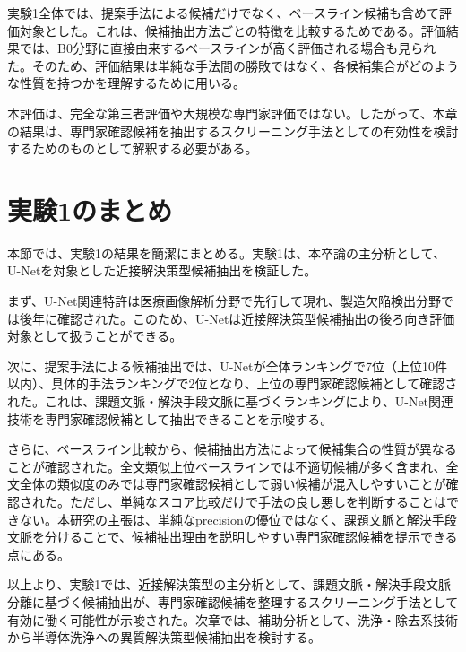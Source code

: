 実験1全体では、提案手法による候補だけでなく、ベースライン候補も含めて評価対象とした。これは、候補抽出方法ごとの特徴を比較するためである。評価結果では、B0分野に直接由来するベースラインが高く評価される場合も見られた。そのため、評価結果は単純な手法間の勝敗ではなく、各候補集合がどのような性質を持つかを理解するために用いる。

本評価は、完全な第三者評価や大規模な専門家評価ではない。したがって、本章の結果は、専門家確認候補を抽出するスクリーニング手法としての有効性を検討するためのものとして解釈する必要がある。

\section{実験1のまとめ}

本節では、実験1の結果を簡潔にまとめる。実験1は、本卒論の主分析として、U-Netを対象とした近接解決策型候補抽出を検証した。

まず、U-Net関連特許は医療画像解析分野で先行して現れ、製造欠陥検出分野では後年に確認された。このため、U-Netは近接解決策型候補抽出の後ろ向き評価対象として扱うことができる。

次に、提案手法による候補抽出では、U-Netが全体ランキングで7位（上位10件以内）、具体的手法ランキングで2位となり、上位の専門家確認候補として確認された。これは、課題文脈・解決手段文脈に基づくランキングにより、U-Net関連技術を専門家確認候補として抽出できることを示唆する。

さらに、ベースライン比較から、候補抽出方法によって候補集合の性質が異なることが確認された。全文類似上位ベースラインでは不適切候補が多く含まれ、全文全体の類似度のみでは専門家確認候補として弱い候補が混入しやすいことが確認された。ただし、単純なスコア比較だけで手法の良し悪しを判断することはできない。本研究の主張は、単純なprecisionの優位ではなく、課題文脈と解決手段文脈を分けることで、候補抽出理由を説明しやすい専門家確認候補を提示できる点にある。

以上より、実験1では、近接解決策型の主分析として、課題文脈・解決手段文脈分離に基づく候補抽出が、専門家確認候補を整理するスクリーニング手法として有効に働く可能性が示唆された。次章では、補助分析として、洗浄・除去系技術から半導体洗浄への異質解決策型候補抽出を検討する。
